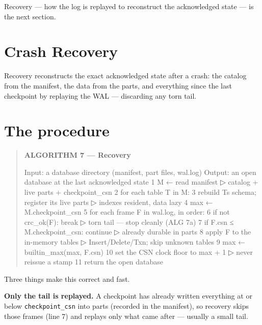 \documentclass[
  11pt,
  openany]{book}
\newenvironment{Shaded}{}{}
\newcommand{\NormalTok}[1]{#1}
\begin{document}
Recovery --- how the log is replayed to reconstruct the acknowledged
state --- is the next section.

\section{Crash Recovery}\label{crash-recovery}

Recovery reconstructs the exact acknowledged state after a crash: the
catalog from the manifest, the data from the parts, and everything since
the last checkpoint by replaying the WAL --- discarding any torn tail.

\section{The procedure}\label{the-procedure}

\begin{quote}
\textbf{ALGORITHM 7 --- Recovery}

\begin{Shaded}
\begin{Highlighting}[]
\NormalTok{Input:  a database directory (manifest, part files, wal.log)}
\NormalTok{Output: an open database at the last acknowledged state}
\NormalTok{1  M ← read manifest                                 ▷ catalog + live parts + checkpoint\_csn}
\NormalTok{2  for each table T in M:}
\NormalTok{3      rebuild T\textquotesingle{}s schema; register its live parts    ▷ indexes resident, data lazy}
\NormalTok{4  max ← M.checkpoint\_csn}
\NormalTok{5  for each frame F in wal.log, in order:}
\NormalTok{6      if not crc\_ok(F): break                        ▷ torn tail — stop cleanly (ALG 7a)}
\NormalTok{7      if F.csn ≤ M.checkpoint\_csn: continue           ▷ already durable in parts}
\NormalTok{8      apply F to the in{-}memory tables                 ▷ Insert/Delete/Txn; skip unknown tables}
\NormalTok{9      max ← builtin\_max(max, F.csn)}
\NormalTok{10 set the CSN clock floor to max + 1                  ▷ never reissue a stamp}
\NormalTok{11 return the open database}
\end{Highlighting}
\end{Shaded}
\end{quote}

Three things make this correct and fast.

\textbf{Only the tail is replayed.} A checkpoint has already written
everything at or below \texttt{checkpoint\_csn} into parts (recorded in
the manifest), so recovery skips those frames (line 7) and replays only
what came after --- usually a small tail.
\end{document}
